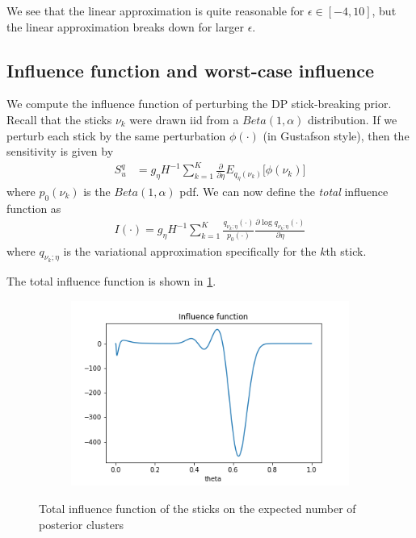 \documentclass[a4paper]{article}
\begin{document}
We see that the linear approximation is quite reasonable for $\epsilon \in [-4, 10]$,
but the linear approximation breaks down for larger $\epsilon$.

\subsection{Influence function and worst-case influence}
We compute the influence function of perturbing the DP stick-breaking prior.
Recall that the sticks $\nu_k$ were drawn iid
from a $Beta(1, \alpha)$ distribution.
If we perturb each stick by the same perturbation $\phi(\cdot)$ (in Gustafson style), then the sensitivity is given by
\begin{align}
S_u^q &=
g_\eta H^{-1} \sum_{k = 1}^K \frac{\partial}{\partial \eta} E_{q_\eta(\nu_k)}\Big[\phi(\nu_k) \Big]
\end{align}
where $p_0(\nu_k)$ is the $Beta(1, \alpha)$ pdf. We can now define the {\itshape total} influence function as
\begin{align}
I(\cdot) = g_\eta H^{-1} \sum_{k = 1}^K \frac{q_{\nu_k; \eta}(\cdot)}{p_0(\cdot)}\frac{\partial\log q_{\nu_k; \eta}(\cdot)}{\partial \eta}
\label{eq:total_influence}
\end{align}
where $q_{\nu_k; \eta}$ is the variational approximation specifically for the $k$th stick.

The total influence function is shown in \ref{fig:influence_func}.

\begin{figure}[h!]
	\centering
	\begin{subfigure}[t]{0.4\textwidth}
		\includegraphics[width = \textwidth]{./func_sens_results/influence_func.png}
	\end{subfigure}
	\caption{Total influence function of the sticks on the expected number of
  posterior clusters}
	\label{fig:influence_func}
\end{figure}
\end{document}
